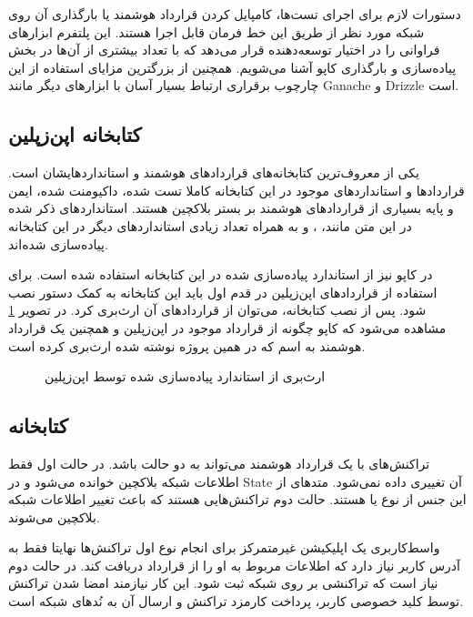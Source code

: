 دستورات لازم برای اجرای تست‌ها،
کامپایل کردن قرارداد هوشمند یا بارگذاری آن روی شبکه مورد نظر از طریق این خط فرمان قابل اجرا هستند.
این پلتفرم ابزارهای فراوانی را در اختیار توسعه‌دهنده قرار می‌دهد
که با تعداد بیشتری از آن‌ها در بخش پیاده‌سازی و بارگذاری کاپو آشنا می‌شویم.
همچنین از بزرگترین مزایای استفاده از این چارچوب برقراری ارتباط بسیار آسان با ابزارهای دیگر مانند
\gls{Ganache}
و
\gls{Drizzle}
است.

\subsection{کتابخانه اپن‌زپلین}
یکی از معروف‌ترین کتابخانه‌های قراردادهای هوشمند و استانداردهایشان است.
قراردادها و استانداردهای موجود در این کتابخانه
کاملا تست شده، داکیومنت شده، ایمن و پایه بسیاری از قراردادهای هوشمند بر بستر بلاکچین هستند.
استانداردهای ذکر شده در این متن مانند،
،
و
به همراه تعداد زیادی استانداردهای دیگر در این کتابخانه پیاده‌سازی شده‌اند.

در کاپو نیز از استاندارد
پیاده‌سازی شده در این کتابخانه استفاده شده است.
برای استفاده از قرارداد‌های اپن‌زپلین در قدم اول باید این کتابخانه به کمک دستور
نصب شود. پس از نصب کتابخانه، می‌توان از قراردادهای آن ارث‌بری کرد.
در تصویر
\ref{fig:inherit-erc721}
مشاهده می‌شود که کاپو چگونه از قرارداد
موجود در اپن‌زپلین و همچنین یک قرارداد هوشمند به اسم
که در همین پروژه نوشته شده ارث‌بری کرده است.

\begin{figure}[H]
\centerline{}
\caption{ارث‌بری از استاندارد  پیاده‌سازی شده توسط اپن‌زپلین}
\label{fig:inherit-erc721}
\end{figure}

\subsection{کتابخانه }
تراکنش‌های با یک قرارداد هوشمند می‌تواند به دو حالت باشد.
در حالت اول فقط اطلاعات شبکه بلاکچین خوانده می‌شود و در
\gls{State}
آن تغییری داده نمی‌شود.
متدهای از این جنس از نوع
یا
هستند. حالت دوم تراکنش‌هایی هستند که باعث تغییر اطلاعات شبکه بلاکچین می‌شوند.

واسط‌کاربری یک اپلیکیشن غیرمتمرکز برای انجام نوع اول تراکنش‌ها
نهایتا فقط به آدرس کاربر نیاز دارد
که اطلاعات مربوط به او را از قرارداد دریافت کند.
در حالت دوم نیاز است که تراکنشی بر روی شبکه ثبت شود.
این کار نیازمند امضا شدن تراکنش توسط کلید خصوصی کاربر،
پرداخت کارمزد تراکنش و ارسال آن به نُدهای شبکه است.

